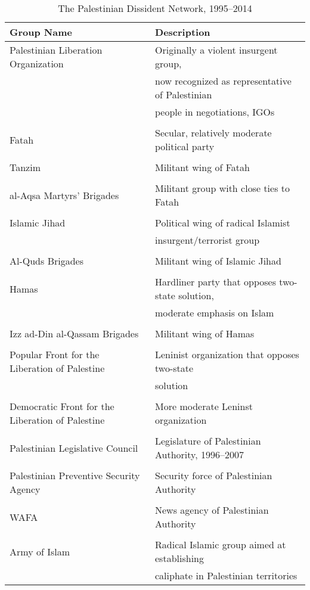 \begin{table}
\centering
\begin{tabular}{ll}
Group Name & Description\\
\hline
Palestinian Liberation Organization & Originally a violent insurgent group,\\
 & now recognized as representative of Palestinian\\
 & people in negotiations, IGOs\\
&\\
Fatah & Secular, relatively moderate political party\\
&\\
Tanzim & Militant wing of Fatah\\
&\\
al-Aqsa Martyrs' Brigades & Militant group with close ties to Fatah\\
&\\
Islamic Jihad & Political wing of radical Islamist\\
& insurgent/terrorist group\\
&\\
Al-Quds Brigades & Militant wing of Islamic Jihad\\
&\\
Hamas & Hardliner party that opposes two-state solution,\\
& moderate emphasis on Islam\\
&\\
Izz ad-Din al-Qassam Brigades & Militant wing of Hamas\\
&\\
Popular Front for the Liberation of Palestine & Leninist organization that opposes two-state\\
& solution\\
&\\
Democratic Front for the Liberation of Palestine & More moderate Leninst organization\\
&\\
Palestinian Legislative Council & Legislature of Palestinian Authority, 1996--2007\\
&\\
Palestinian Preventive Security Agency & Security force of Palestinian Authority\\
&\\
WAFA & News agency of Palestinian Authority\\
&\\
Army of Islam & Radical Islamic group aimed at establishing\\
& caliphate in Palestinian territories\\
\hline
\end{tabular}
\caption{The Palestinian Dissident Network, 1995--2014}
\label{paldiss}
\end{table}

